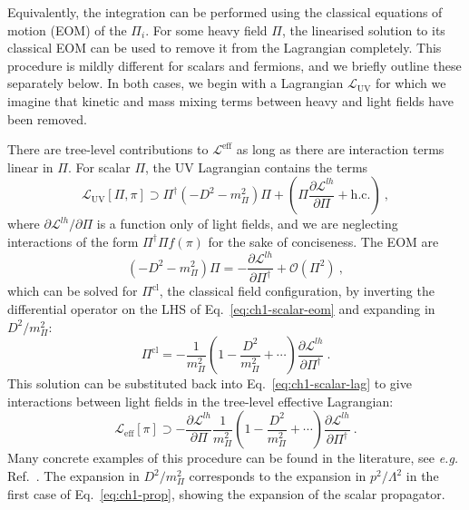 Equivalently, the integration can be performed using the classical equations of
motion (EOM) of the $\Pi_{i}$. For some heavy field $\Pi$, the linearised
solution to its classical EOM can be used to remove it from the Lagrangian
completely. This procedure is mildly different for scalars and fermions, and we
briefly outline these separately below. In both cases, we begin with a
Lagrangian $\mathscr{L}_{\text{UV}}$ for which we imagine that kinetic and mass
mixing terms between heavy and light fields have been removed.

There are tree-level contributions to $\mathscr{L}^{\text{eff}}$ as long as
there are interaction terms linear in $\Pi$. For scalar $\Pi$, the UV Lagrangian
contains the terms
\begin{equation}
  \label{eq:ch1-scalar-lag}
  \mathscr{L}_{\text{UV}}[\Pi, \pi] \supset \Pi^{\dagger} (- D^{2} - m_{\Pi}^{2}) \Pi + \left(\Pi \frac{\partial \mathscr{L}^{lh}}{\partial \Pi} + \text{h.c.} \right) \ ,
\end{equation}
where $\partial \mathscr{L}^{lh} / \partial \Pi$ is a function only of
light fields, and we are neglecting interactions of the form
$\Pi^{\dagger} \Pi f(\pi)$ for the sake of conciseness. The EOM are
\begin{equation}
  \label{eq:ch1-scalar-eom}
  (- D^{2} - m_{\Pi}^{2}) \Pi = - \frac{\partial \mathscr{L}^{lh}}{\partial \Pi^{\dagger}} + \mathcal{O}(\Pi^{2}) \ ,
\end{equation}
which can be solved for $\Pi^{\text{cl}}$, the classical field configuration, by
inverting the differential operator on the LHS of Eq.~\eqref{eq:ch1-scalar-eom} and
expanding in $D^{2} / m_{\Pi}^{2}$:
\begin{equation}
  \label{eq:ch1-scalar-repl}
  \Pi^{\text{cl}} = - \frac{1}{m_{\Pi}^{2}} \left( 1 - \frac{D^{2}}{m_{\Pi}^{2}}  + \cdots \right) \frac{\partial \mathscr{L}^{lh}}{\partial \Pi^{\dagger}} \ .
\end{equation}
This solution can be substituted back into Eq.~\eqref{eq:ch1-scalar-lag} to give
interactions between light fields in the tree-level effective Lagrangian:
\begin{equation}
  \label{eq:ch1-classical-efflag-scalar}
  \mathscr{L}_{\text{eff}}[\pi] \supset - \frac{\partial \mathscr{L}^{lh}}{\partial \Pi} \frac{1}{m_{\Pi}^{2}} \left( 1 - \frac{D^{2}}{m_{\Pi}^{2}} + \cdots \right) \frac{\partial \mathscr{L}^{lh}}{\partial \Pi^{\dagger}} \ .
\end{equation}
Many concrete examples of this procedure can be found in the literature, see
\textit{e.g.} Ref.~\cite{Henning:2014wua}. The expansion in $D^{2}/m_{\Pi}^{2}$
corresponds to the expansion in $p^{2} / \Lambda^{2}$ in the first case of
Eq.~\eqref{eq:ch1-prop}, showing the expansion of the scalar propagator.

